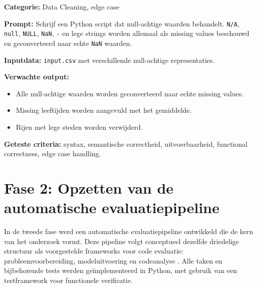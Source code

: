 \textbf{Categorie:} Data Cleaning, edge case

\textbf{Prompt:} Schrijf een Python script dat null-achtige waarden behandelt. \texttt{N/A}, \texttt{null}, \texttt{NULL}, \texttt{NaN}, \texttt{-} en lege strings worden allemaal als missing values beschouwd en geconverteerd naar echte \texttt{NaN} waarden.

\textbf{Inputdata:} \texttt{input.csv} met verschillende null-achtige representaties.

\textbf{Verwachte output:}
\begin{itemize}
    \item Alle null-achtige waarden worden geconverteerd naar echte missing values.
    \item Missing leeftijden worden aangevuld met het gemiddelde.
    \item Rijen met lege steden worden verwijderd.
\end{itemize}

\textbf{Geteste criteria:} syntax, semantische correctheid, uitvoerbaarheid, functional correctness, edge case handling.



\section{Fase 2: Opzetten van de automatische evaluatiepipeline}

In de tweede fase werd een automatische evaluatiepipeline ontwikkeld die de kern van het onderzoek vormt. Deze pipeline volgt conceptueel dezelfde driedelige structuur als voorgestelde frameworks voor code evaluatie: probleemvoorbereiding, modeluitvoering en codeanalyse \autocite{Li2023,LopezEspejel2025}. Alle taken en bijbehorende tests werden geïmplementeerd in Python, met gebruik van een testframework voor functionele verificatie.

